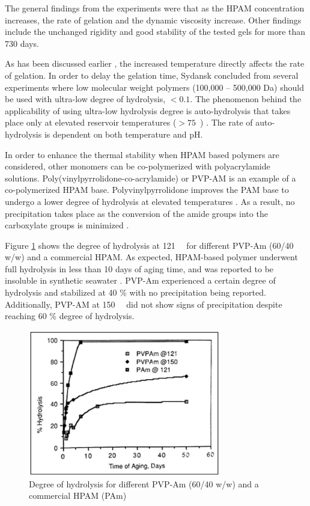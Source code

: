 The general findings from the experiments were that as the HPAM concentration increases, the rate of gelation and the dynamic viscosity increase. Other findings include the unchanged rigidity and good stability of the tested gels for more than 730 days.

As has been discussed earlier \citep{Albonico1994}, the increased temperature directly affects the rate of gelation. In order to delay the gelation time, Sydansk concluded from several experiments where low molecular weight polymers (100,000 – 500,000 Da) should be used with ultra-low degree of hydrolysis, $< 0.1$. The phenomenon behind the applicability of using ultra-low hydrolysis degree is auto-hydrolysis that takes place only at elevated reservoir temperatures ($> 75$~\celsius) \citep{Sydansk1993, Fletcher2010}. The rate of auto-hydrolysis is dependent on both temperature and pH.

In order to enhance the thermal stability when HPAM based polymers are considered, other monomers can be co-polymerized with polyacrylamide solutions. Poly(vinylpyrrolidone-co-acrylamide) or PVP-AM is an example of a co-polymerized HPAM base. Polyvinylpyrrolidone improves the PAM base to undergo a lower degree of hydrolysis at elevated temperatures \citep{Stahl1988}. As a result, no precipitation takes place as the conversion of the amide groups into the carboxylate groups is minimized \citep{Al-Muntasheri2012}.

Figure \ref{fig:hyrolysisStahl} shows the degree of hydrolysis at 121~\celsius~ for different PVP-Am (60/40 w/w) and a commercial HPAM. As expected, HPAM-based polymer underwent full hydrolysis in less than 10 days of aging time, and was reported to be insoluble in synthetic seawater \citep{Stahl1988}. PVP-Am experienced a certain degree of hydrolysis and stabilized at 40 \% with no precipitation being reported. Additionally, PVP-AM at 150~\celsius~ did not show signs of precipitation despite reaching 60 \% degree of hydrolysis.

\begin{figure}
    \centering
    \includegraphics[width=0.75\textwidth]{img/fig/hyrolysisStahl.png}
    \caption{Degree of hydrolysis for different PVP-Am (60/40 w/w) and a commercial HPAM (PAm) \citep{Stahl1988}}
    \label{fig:hyrolysisStahl} %
\end{figure}

